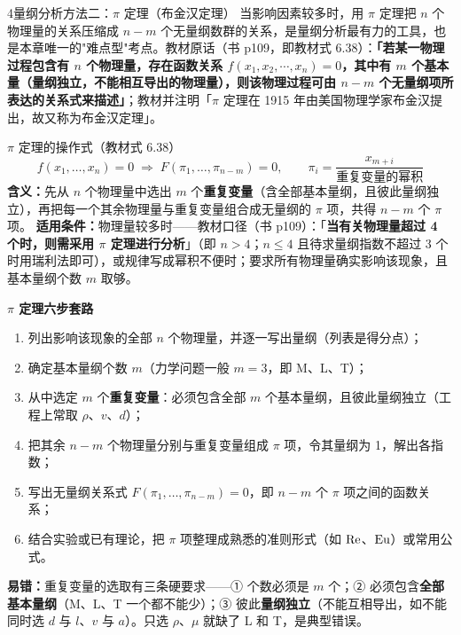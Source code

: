 \begin{kaodian}{4}{量纲分析方法二：$\pi$ 定理（布金汉定理）}
当影响因素较多时，用 $\pi$ 定理把 $n$ 个物理量的关系压缩成 $n-m$ 个无量纲数群的关系，是量纲分析最有力的工具，也是本章唯一的"难点型"考点。教材原话（书 p109，即教材式 6.38）：\textbf{「若某一物理过程包含有 $n$ 个物理量，存在函数关系 $f(x_1,x_2,\cdots,x_n)=0$，其中有 $m$ 个基本量（量纲独立，不能相互导出的物理量），则该物理过程可由 $n-m$ 个无量纲项所表达的关系式来描述」}；教材并注明「$\pi$ 定理在 1915 年由美国物理学家布金汉提出，故又称为布金汉定理」。

\begin{gongshi}{$\pi$ 定理的操作式（教材式 6.38）}
\[ f(x_1,\dots,x_n)=0 \;\Longrightarrow\; F(\pi_1,\dots,\pi_{n-m})=0,\qquad \pi_i=\frac{x_{m+i}}{\text{重复变量的幂积}} \]
\textbf{含义：}先从 $n$ 个物理量中选出 $m$ 个\textbf{重复变量}（含全部基本量纲，且彼此量纲独立），再把每一个其余物理量与重复变量组合成无量纲的 $\pi$ 项，共得 $n-m$ 个 $\pi$ 项。
\textbf{适用条件：}物理量较多时——教材口径（书 p109）：「\textbf{当有关物理量超过 4 个时，则需采用 $\pi$ 定理进行分析}」（即 $n>4$；$n\le 4$ 且待求量纲指数不超过 3 个时用瑞利法即可），或规律写成幂积不便时；要求所有物理量确实影响该现象，且基本量纲个数 $m$ 取够。
\end{gongshi}

\begin{banfa}
\textbf{$\pi$ 定理六步套路}
\begin{enumerate}
\item 列出影响该现象的全部 $n$ 个物理量，并逐一写出量纲（列表是得分点）；
\item 确定基本量纲个数 $m$（力学问题一般 $m=3$，即 M、L、T）；
\item 从中选定 $m$ 个\textbf{重复变量}：必须包含全部 $m$ 个基本量纲，且彼此量纲独立（工程上常取 $\rho$、$v$、$d$）；
\item 把其余 $n-m$ 个物理量分别与重复变量组成 $\pi$ 项，令其量纲为 1，解出各指数；
\item 写出无量纲关系式 $F(\pi_1,\dots,\pi_{n-m})=0$，即 $n-m$ 个 $\pi$ 项之间的函数关系；
\item 结合实验或已有理论，把 $\pi$ 项整理成熟悉的准则形式（如 $\mathrm{Re}$、$\mathrm{Eu}$）或常用公式。
\end{enumerate}
\end{banfa}

\begin{yicuo}
\textbf{易错：}重复变量的选取有三条硬要求——① 个数必须是 $m$ 个；② 必须包含\textbf{全部基本量纲}（M、L、T 一个都不能少）；③ 彼此\textbf{量纲独立}（不能互相导出，如不能同时选 $d$ 与 $l$、$v$ 与 $a$）。只选 $\rho$、$\mu$ 就缺了 L 和 T，是典型错误。
\end{yicuo}


\end{kaodian}
